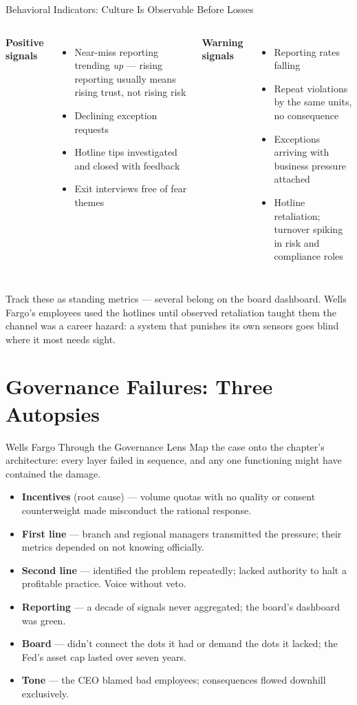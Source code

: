 \documentclass[11pt, aspectratio=169]{beamer}
\begin{document}
\begin{frame}{Behavioral Indicators: Culture Is Observable Before Losses}
\begin{columns}[T]
\textbf{Positive signals}
\begin{itemize}
  \item Near-miss reporting trending \emph{up} --- rising reporting usually means rising trust, not rising risk
  \item Declining exception requests
  \item Hotline tips investigated and closed with feedback
  \item Exit interviews free of fear themes
\end{itemize}
\textbf{Warning signals}
\begin{itemize}
  \item Reporting rates falling
  \item Repeat violations by the same units, no consequence
  \item Exceptions arriving with business pressure attached
  \item Hotline retaliation; turnover spiking in risk and compliance roles
\end{itemize}
\end{columns}
\medskip
Track these as standing metrics --- several belong on the board dashboard. Wells Fargo's employees used the hotlines until observed retaliation taught them the channel was a career hazard: \alert{a system that punishes its own sensors goes blind where it most needs sight}.
\end{frame}

\section{Governance Failures: Three Autopsies}

\begin{frame}{Wells Fargo Through the Governance Lens}
Map the case onto the chapter's architecture: \alert{every layer failed in sequence}, and any one functioning might have contained the damage.
\begin{itemize}
  \item \textbf{Incentives} (root cause) --- volume quotas with no quality or consent counterweight made misconduct the rational response.
  \item \textbf{First line} --- branch and regional managers transmitted the pressure; their metrics depended on not knowing officially.
  \item \textbf{Second line} --- identified the problem repeatedly; lacked authority to halt a profitable practice. Voice without veto.
  \item \textbf{Reporting} --- a decade of signals never aggregated; the board's dashboard was green.
  \item \textbf{Board} --- didn't connect the dots it had or demand the dots it lacked; the Fed's asset cap lasted over seven years.
  \item \textbf{Tone} --- the CEO blamed bad employees; consequences flowed downhill exclusively.
\end{itemize}
\end{frame}
\end{document}
